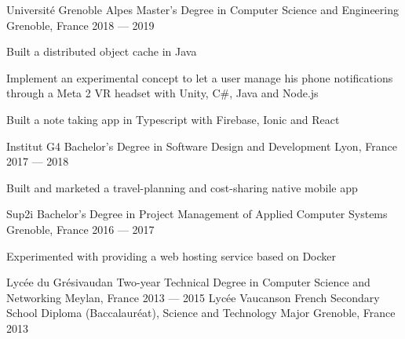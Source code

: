 

\begin{cventries}

  \cventry
    {Université Grenoble Alpes} %
    {Master's Degree in Computer Science and Engineering} %
    {Grenoble, France} %
    {2018 — 2019} %
    {
      \begin{cvitems} %
        \item {Built a distributed object cache in Java}
        \item {Implement an experimental concept to let a user manage his phone notifications through a Meta 2 VR headset with Unity, C\#, Java and Node.js}
        \item {Built a note taking app in Typescript with Firebase, Ionic and React}
      \end{cvitems}
    }
  \cventry
    {Institut G4} %
    {Bachelor's Degree in Software Design and Development} %
    {Lyon, France} %
    {2017 — 2018} %
    {
      \begin{cvitems} %
        \item {Built and marketed a travel-planning and cost-sharing native mobile app}
      \end{cvitems}
    }
  \cventry
    {Sup2i} %
    {Bachelor's Degree in Project Management of Applied Computer Systems} %
    {Grenoble, France} %
    {2016 — 2017} %
    {
      \begin{cvitems} %
        \item {Experimented with providing a web hosting service based on Docker}
      \end{cvitems}
    }
  \cventryy
    {Lycée du Grésivaudan} %
    {Two-year Technical Degree in Computer Science and Networking} %
    {Meylan, France} %
    {2013 — 2015} %
  \cventryy
    {Lycée Vaucanson} %
    {French Secondary School Diploma (Baccalauréat), Science and Technology Major} %
    {Grenoble, France} %
    {2013} %
\end{cventries}

